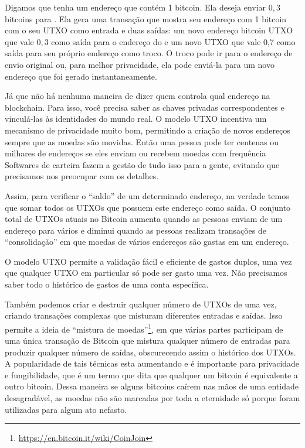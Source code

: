 Digamos que \TraducaoNomeA tenha um endereço que contém 1 bitcoin. Ela deseja enviar $0,3$ bitcoins para \TraducaoNomeB. Ela gera uma transação que mostra seu endereço com 1 bitcoin com o seu UTXO como entrada e duas saídas: um novo endereço bitcoin UTXO que vale $0,3$ como saída para o endereço do \TraducaoNomeB e um novo UTXO que vale 0,7 como saída para seu próprio endereço como troco.
O troco pode ir para o endereço de envio original ou, para melhor privacidade, ela pode enviá-la para um novo endereço que foi gerado instantaneamente.

Já que não há nenhuma maneira de dizer quem controla qual endereço na blockchain. 
Para isso, você precisa saber as chaves privadas correspondentes e vinculá-las às identidades do mundo real. 
O modelo UTXO incentiva um mecanismo de privacidade muito bom, permitindo a criação de novos endereços sempre que as moedas são movidas.
Então uma pessoa pode ter centenas ou milhares de endereços se eles enviam ou recebem moedas com frequência
Softwares de carteira fazem a gestão de tudo isso para a gente, evitando que precisamos nos preocupar com os detalhes.

Assim, para verificar o “saldo” de um determinado endereço, na verdade temos que somar todos os UTXOs que possuem este endereço como saída. 
O conjunto total de UTXOs atuais no Bitcoin aumenta quando as pessoas enviam de um endereço para vários e diminui quando as pessoas realizam transações de “consolidação” em que moedas de vários endereços são gastas em um endereço.

O modelo UTXO permite a validação fácil e eficiente de gastos duplos, uma vez que qualquer UTXO em particular só pode ser gasto uma vez. Não precisamos saber todo o histórico de gastos de uma conta específica.

Também podemos criar e destruir qualquer número de UTXOs de uma vez, criando transações complexas que misturam diferentes entradas e saídas.
Isso permite a ideia de “mistura de moedas”\footnote{\url{https://en.bitcoin.it/wiki/CoinJoin}}, em que várias partes participam de uma única transação de Bitcoin que mistura qualquer número de entradas para produzir qualquer número de saídas, obscurecendo assim o histórico dos UTXOs.
A popularidade de tais técnicas esta aumentando e é importante para privacidade e fungibilidade, que é um termo que dita que qualquer um bitcoin é equivalente a outro bitcoin.
Dessa maneira se alguns bitcoins caírem nas mãos de uma entidade desagradável, as moedas não são marcadas por toda a eternidade só porque foram utilizadas para algum ato nefasto.

